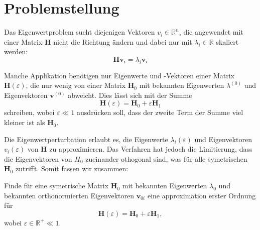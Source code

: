 %
%
%
\section{Problemstellung
\label{ew:section:problemstellung}}


Das Eigenwertproblem sucht diejenigen Vektoren $v_i \in \mathbb{R}^{n} $, die angewendet mit einer Matrix $\bm H$ nicht die Richtung ändern und dabei nur mit $\lambda_i \in \mathbb{R}$ skaliert werden:
\begin{equation}
    \bm H \bm v_i = \lambda_i \bm v_i \label{ew:eq:eig}
\end{equation}

Manche Applikation benötigen nur Eigenwerte und -Vektoren einer Matrix $\bm H(\varepsilon)$, die nur wenig von einer Matrix $\bm H_0$ mit bekannten Eigenwerten $\lambda^{(0)}$ und Eigenvektoren $\bm v^{(0)}$ abweicht.
Dies lässt sich mit der Summe
\begin{equation}
    \bm H(\varepsilon) = \bm H_0 + \varepsilon \bm H_1
\end{equation}
schreiben, wobei $\varepsilon \ll 1 $ ausdrücken soll, dass der zweite Term der Summe viel kleiner ist als $\bm H_0$.




Die Eigenwertperturbation erlaubt es, die Eigenwerte $\lambda_i(\varepsilon)$ und Eigenvektoren  $v_i(\varepsilon)$ von $\bm H$ zu approximieren.
Das Verfahren hat jedoch die Limitierung, dass die Eigenvektoren von $H_0$ zueinander othogonal sind, was für alle symetrischen $\bm H_0$ zutrifft.
Somit fassen wir zusammen:
\begin{aufgabe}
Finde für eine symetrische Matrix $\bm H_0$ mit bekannten Eigenwerten $\lambda_{0}$ und bekannten orthonormierten Eigenvektoren $\bm v_{0i}$ eine approximation erster Ordnung für
\begin{equation*}
    \bm H(\varepsilon) = \bm H_0 + \varepsilon \bm H_1,
\end{equation*}
wobei $\varepsilon \in \mathbb{R^+} \ll 1$.
\end{aufgabe}

